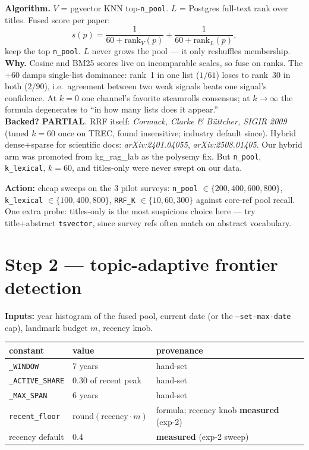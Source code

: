 \documentclass[10pt]{article}
\newenvironment{varbox}
  {\par\medskip\begin{lrbox}{\varboxsave}%
   \begin{minipage}{\dimexpr\linewidth-2\fboxsep\relax}\small\vspace{4pt}}
  {\vspace{4pt}\end{minipage}\end{lrbox}%
   \noindent\colorbox{boxbg}{\usebox{\varboxsave}}\par\medskip}
\newcommand{\backedpart}{\textcolor{orange!80!black}{\textbf{PARTIAL}}}
\newcommand{\lit}[1]{\textcolor{blue!60!black}{\textit{#1}}}
\newcommand{\act}[1]{\par\smallskip\noindent\textbf{Action:} #1}
\begin{document}
\textbf{Algorithm.} $V$ = pgvector KNN top-\texttt{n\_pool}. $L$ = Postgres full-text rank
over titles. Fused score per paper:
\[ s(p) = \frac{1}{60 + \mathrm{rank}_V(p)} + \frac{1}{60 + \mathrm{rank}_L(p)}, \]
keep the top \texttt{n\_pool}. $L$ never grows the pool --- it only reshuffles membership. \\
\textbf{Why.} Cosine and BM25 scores live on incomparable scales, so fuse on ranks. The
$+60$ damps single-list dominance: rank~1 in one list ($1/61$) loses to rank~30 in both
($2/90$), i.e.\ agreement between two weak signals beats one signal's confidence. At $k{=}0$
one channel's favorite steamrolls consensus; at $k{\to}\infty$ the formula degenerates to
``in how many lists does it appear.'' \\
\textbf{Backed?} \backedpart. RRF itself: \lit{Cormack, Clarke \& B\"uttcher, SIGIR 2009}
(tuned $k{=}60$ once on TREC, found insensitive; industry default since). Hybrid dense+sparse
for scientific docs: \lit{arXiv:2401.04055}, \lit{arXiv:2508.01405}. Our hybrid arm was
promoted from kg\_rag\_lab as the polysemy fix. But \texttt{n\_pool}, \texttt{k\_lexical},
$k{=}60$, and titles-only were never swept on our data. \\
\act{cheap sweeps on the 3 pilot surveys: \texttt{n\_pool} $\in \{200,400,600,800\}$,
\texttt{k\_lexical} $\in \{100,400,800\}$, \texttt{RRF\_K} $\in \{10,60,300\}$ against
core-ref pool recall. One extra probe: titles-only is the most suspicious choice here ---
try title+abstract \texttt{tsvector}, since survey refs often match on abstract vocabulary.}

\section{Step 2 --- topic-adaptive frontier detection}
\textbf{Inputs:} year histogram of the fused pool, current date (or the \texttt{--set-max-date}
cap), landmark budget $m$, recency knob.

\begin{varbox}
\begin{tabular}{@{}lll@{}}
\toprule
constant & value & provenance \\
\midrule
\texttt{\_WINDOW} & 7 years & hand-set \\
\texttt{\_ACTIVE\_SHARE} & 0.30 of recent peak & hand-set \\
\texttt{\_MAX\_SPAN} & 6 years & hand-set \\
\texttt{recent\_floor} & $\mathrm{round}(\text{recency} \cdot m)$ & formula; recency knob \textbf{measured} (exp-2) \\
recency default & 0.4 & \textbf{measured} (exp-2 sweep) \\
\bottomrule
\end{tabular}
\end{varbox}
\end{document}

